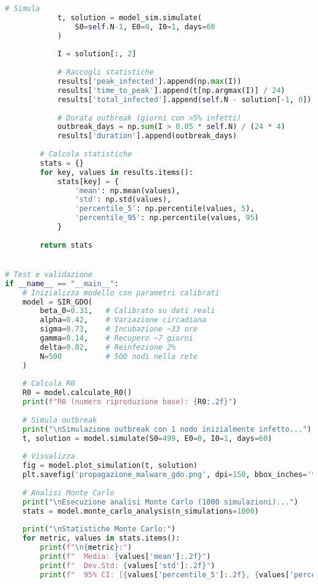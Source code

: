\begin{lstlisting}[language=Python, caption=Simulazione modello SIR adattato per GDO]
            # Simula
            t, solution = model_sim.simulate(
                S0=self.N-1, E0=0, I0=1, days=60
            )
            
            I = solution[:, 2]
            
            # Raccogli statistiche
            results['peak_infected'].append(np.max(I))
            results['time_to_peak'].append(t[np.argmax(I)] / 24)
            results['total_infected'].append(self.N - solution[-1, 0])
            
            # Durata outbreak (giorni con >5% infetti)
            outbreak_days = np.sum(I > 0.05 * self.N) / (24 * 4)
            results['duration'].append(outbreak_days)
        
        # Calcola statistiche
        stats = {}
        for key, values in results.items():
            stats[key] = {
                'mean': np.mean(values),
                'std': np.std(values),
                'percentile_5': np.percentile(values, 5),
                'percentile_95': np.percentile(values, 95)
            }
            
        return stats


# Test e validazione
if __name__ == "__main__":
    # Inizializza modello con parametri calibrati
    model = SIR_GDO(
        beta_0=0.31,   # Calibrato su dati reali
        alpha=0.42,    # Variazione circadiana
        sigma=0.73,    # Incubazione ~33 ore
        gamma=0.14,    # Recupero ~7 giorni
        delta=0.02,    # Reinfezione 2%
        N=500          # 500 nodi nella rete
    )
    
    # Calcola R0
    R0 = model.calculate_R0()
    print(f"R0 (numero riproduzione base): {R0:.2f}")
    
    # Simula outbreak
    print("\nSimulazione outbreak con 1 nodo inizialmente infetto...")
    t, solution = model.simulate(S0=499, E0=0, I0=1, days=60)
    
    # Visualizza
    fig = model.plot_simulation(t, solution)
    plt.savefig('propagazione_malware_gdo.png', dpi=150, bbox_inches='tight')
    
    # Analisi Monte Carlo
    print("\nEsecuzione analisi Monte Carlo (1000 simulazioni)...")
    stats = model.monte_carlo_analysis(n_simulations=1000)
    
    print("\nStatistiche Monte Carlo:")
    for metric, values in stats.items():
        print(f"\n{metric}:")
        print(f"  Media: {values['mean']:.2f}")
        print(f"  Dev.Std: {values['std']:.2f}")
        print(f"  95% CI: [{values['percentile_5']:.2f}, {values['percentile_95']:.2f}]")
\end{lstlisting}

